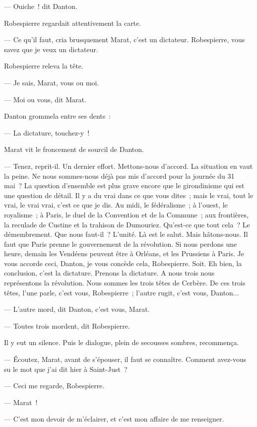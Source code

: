 \documentclass[french,twoside]{book} %
\begin{document}
— Ouiche ! dit Danton.\par
Robespierre regardait attentivement la carte.\par
— Ce qu’il faut, cria brusquement Marat, c’est un dictateur. Robespierre, vous savez que je veux un dictateur.\par
Robespierre releva la tête.\par
— Je sais, Marat, vous ou moi.\par
— Moi ou vous, dit Marat.\par
Danton grommela entre ses dents :\par
— La dictature, touchez-y !\par
Marat vit le froncement de sourcil de Danton.\par
— Tenez, reprit-il. Un dernier effort. Mettons-nous d’accord. La situation en vaut la peine. Ne nous sommes-nous déjà pas mis d’accord pour la journée du 31 mai ? La question d’ensemble est plus grave encore que le girondinisme qui est une question de détail. Il y a du vrai dans ce que vous dites ; mais le vrai, tout le vrai, le vrai vrai, c’est ce que je dis. Au midi, le fédéralisme ; à l’ouest, le royalisme ; à Paris, le duel de la Convention et de la Commune ; aux frontières, la reculade de Custine et la trahison de Dumouriez. Qu’est-ce que tout cela ? Le démembrement. Que nous faut-il ? L’unité. Là est le salut. Mais hâtons-nous. Il faut que Paris prenne le gouvernement de la révolution. Si nous perdons une heure, demain les Vendéens peuvent être à Orléans, et les Prussiens à Paris. Je vous accorde ceci, Danton, je vous concède  cela, Robespierre. Soit. Eh bien, la conclusion, c’est la dictature. Prenons la dictature. A nous trois nous représentons la révolution. Nous sommes les trois têtes de Cerbère. De ces trois têtes, l’une parle, c’est vous, Robespierre ; l’autre rugit, c’est vous, Danton...\par
— L’autre mord, dit Danton, c’est vous, Marat.\par
— Toutes trois mordent, dit Robespierre.\par
Il y eut un silence. Puis le dialogue, plein de secousses sombres, recommença.\par
— Écoutez, Marat, avant de s’épouser, il faut se connaître. Comment avez-vous su le mot que j’ai dit hier à Saint-Just ?\par
— Ceci me regarde, Robespierre.\par
— Marat !\par
— C’est mon devoir de m’éclairer, et c’est mon affaire de me renseigner.\par
\end{document}
